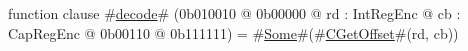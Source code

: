 function clause #\hyperref[zdecode]{decode}# (0b010010 @ 0b00000 @ rd : IntRegEnc @ cb : CapRegEnc @    0b00110 @ 0b111111) = #\hyperref[zSome]{Some}#(#\hyperref[zCGetOffset]{CGetOffset}#(rd, cb))
